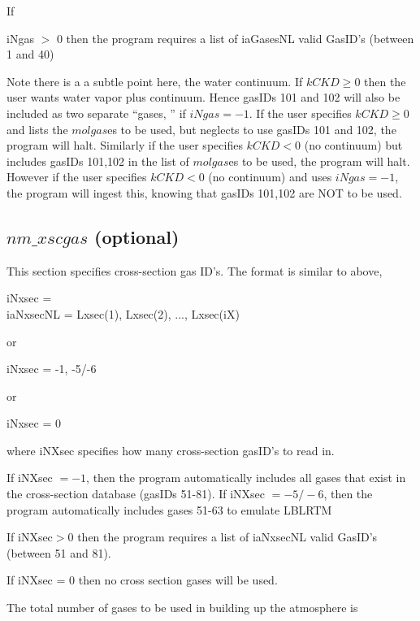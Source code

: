 \documentclass[12pt]{article}
\newcommand{\ttab}{\indent\indent}
\begin{document}
If {\sf iNgas $>$ 0 then the program requires a list of {\sf iaGasesNL} valid GasID's
(between 1 and 40)

Note there is a a subtle point here, the water continuum. If $kCKD \ge 0$ then 
the user wants water vapor plus continuum. Hence gasIDs 101 and 102 will also
be included as two separate ``gases, '' if $iNgas = -1$. If the user
specifies $kCKD \ge 0$ and lists the $molgas$es to be used, but neglects to
use gasIDs 101 and 102, the program will halt. Similarly if the user
specifies $kCKD < 0$ (no continuum) but includes gasIDs 101,102 in the list
of $molgas$es to be used, the program will halt. However if the user
specifies $kCKD <  0$ (no continuum) and uses $iNgas = -1$, the program will
ingest this, knowing that gasIDs 101,102 are NOT to be used.

\subsection{$nm\_xscgas$ (optional)}

This section specifies cross-section gas ID's.  The format is similar to 
above,

\smallskip
{\sf 
\ttab iNxsec = \\
\ttab iaNxsecNL = Lxsec(1),  Lxsec(2),  ..., Lxsec(iX)
}

\smallskip
\noindent or 

\smallskip
{\sf 
\ttab iNxsec = -1, -5/-6
}

\smallskip
\noindent or 

\smallskip
{\sf 
\ttab iNxsec = 0
}

\medskip\noindent 
where {\sf iNXsec} specifies how many cross-section gasID's to read in.

If {\sf iNXsec} $ = -1$, then the program automatically includes all gases
that exist in the cross-section database (gasIDs 51-81).\newline
If {\sf iNXsec} $ = -5/-6$, then the program automatically includes gases 51-63 to
emulate LBLRTM \newline

If {\sf iNXsec}$> 0$ then the program requires a list of {\sf
iaNxsecNL} valid GasID's (between 51 and 81). \newline

If {\sf iNXsec} = 0 then no cross section gases will be used. \newline

The total number of gases to be used in building up the atmosphere is

}
\end{document}

